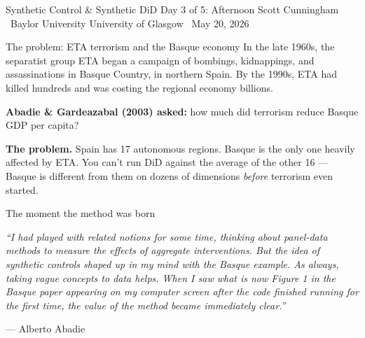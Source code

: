 \documentclass[aspectratio=169,11pt]{beamer}
\begin{document}

\remixtitleframe
  {Synthetic Control \& Synthetic DiD}
  {Day 3 of 5: Afternoon}
  {Scott Cunningham \textperiodcentered\ Baylor University}
  {University of Glasgow \textperiodcentered\ May 20, 2026}

\begin{frame}{The problem: ETA terrorism and the Basque economy}
\vspace{0.4em}
In the late 1960s, the separatist group ETA began a campaign of bombings, kidnappings, and assassinations in Basque Country, in northern Spain. By the 1990s, ETA had killed hundreds and was costing the regional economy billions.

\vspace{0.6em}
\textbf{Abadie \& Gardeazabal (2003) asked:} \;how much did terrorism reduce Basque GDP per capita?

\vspace{0.6em}
\textbf{The problem.} \;Spain has 17 autonomous regions. Basque is the only one heavily affected by ETA. You can't run DiD against the average of the other 16 --- Basque is different from them on dozens of dimensions \textit{before} terrorism even started.

\vspace{0.4em}
\end{frame}

\begin{frame}{The moment the method was born}
\vspace{0.7em}
\begin{center}\itshape\small
``I had played with related notions for some time, thinking about panel-data methods to measure the effects of aggregate interventions. \;But the idea of synthetic controls shaped up in my mind with the Basque example. \;As always, taking vague concepts to data helps. \; \;When I saw what is now Figure 1 in the Basque paper appearing on my computer screen after the code finished running for the first time, the value of the method became immediately clear.''
\end{center}

\vspace{0.6em}
\hfill \small --- Alberto Abadie

\vspace{0.6em}
\end{frame}
\end{document}
